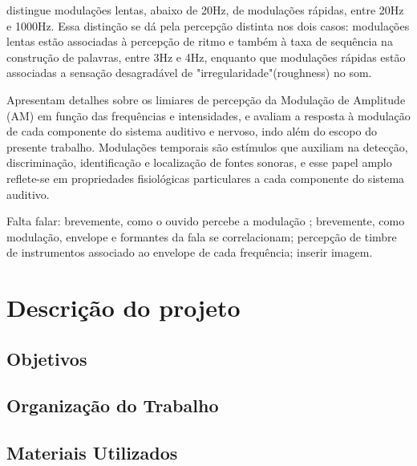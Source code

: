 \citet{langner1992} distingue modulações lentas, abaixo de 20Hz, de
modulações rápidas, entre 20Hz e 1000Hz. Essa distinção se dá pela percepção
distinta nos dois casos: modulações lentas estão associadas à percepção de
ritmo e também à taxa de sequência na construção de palavras, entre 3Hz e 4Hz,
enquanto que modulações rápidas estão associadas a sensação desagradável
de "irregularidade"(roughness) no som. 

\citet{zwicker2013} Apresentam detalhes sobre os limiares de percepção da
Modulação de Amplitude (AM) em função das frequências e intensidades, \citet{joris2004} e
\citet{langner1992} avaliam a resposta à modulação de cada componente do 
sistema auditivo e nervoso, indo além do escopo do
presente trabalho. Modulações temporais são estímulos que auxiliam na detecção,
discriminação, identificação e localização de fontes sonoras,
e esse papel amplo reflete-se em propriedades fisiológicas particulares a cada
componente do sistema auditivo. 

Falta falar: brevemente, como o ouvido percebe a modulação ; brevemente, como modulação,
 envelope e formantes da fala se correlacionam; percepção de timbre de instrumentos
  associado ao envelope de cada frequência; inserir imagem.

\section{Descrição do projeto}
\subsection{Objetivos}
\subsection{Organização do Trabalho}
\subsection{Materiais Utilizados}
